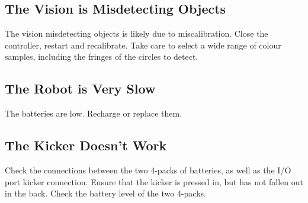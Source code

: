 \documentclass[a4paper]{scrartcl}
\begin{document}
\subsection{The Vision is Misdetecting Objects}

The vision misdetecting objects is likely due to miscalibration. Close the
controller, restart and recalibrate. Take care to select a wide range of colour
samples, including the fringes of the circles to detect.

\subsection{The Robot is Very Slow}

The batteries are low. Recharge or replace them.

\subsection{The Kicker Doesn't Work}

Check the connections between the two 4-packs of batteries, as well as the I/O
port kicker connection. Ensure that the kicker is pressed in, but has not
fallen out in the back. Check the battery level of the two 4-packs.
\end{document}
